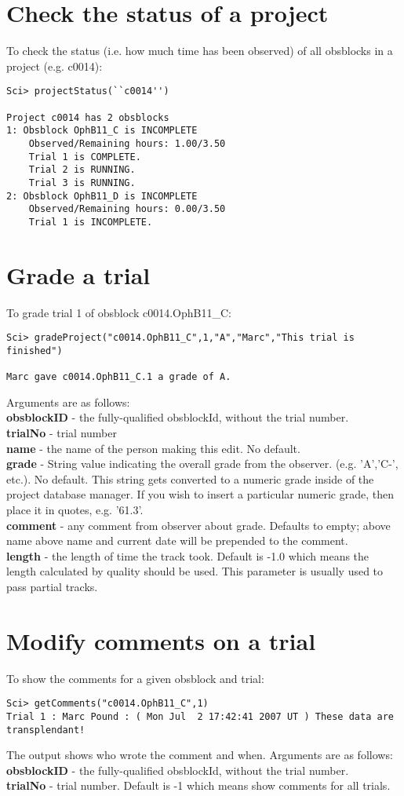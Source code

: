 \documentclass[preprint]{aastex} %
\begin{document}
\section{Check the status of a project}
To check the status (i.e. how much time has been observed) of all obsblocks in a project (e.g. c0014):
\begin{verbatim}
Sci> projectStatus(``c0014'')

Project c0014 has 2 obsblocks 
1: Obsblock OphB11_C is INCOMPLETE
    Observed/Remaining hours: 1.00/3.50
    Trial 1 is COMPLETE. 
    Trial 2 is RUNNING. 
    Trial 3 is RUNNING. 
2: Obsblock OphB11_D is INCOMPLETE
    Observed/Remaining hours: 0.00/3.50
    Trial 1 is INCOMPLETE. 
\end{verbatim}

\section{Grade a trial}
To grade trial 1 of obsblock c0014.OphB11\_C:
\begin{verbatim}
Sci> gradeProject("c0014.OphB11_C",1,"A","Marc","This trial is finished")

Marc gave c0014.OphB11_C.1 a grade of A.
\end{verbatim}
\noindent Arguments are as follows:\\
{\bf obsblockID} - the fully-qualified obsblockId, without the trial number.\\
{\bf trialNo} - trial number\\
{\bf name} - the name of the person making this edit. No default.\\
{\bf grade} - String value indicating the overall grade from the observer. (e.g. 'A','C-', etc.). No default.  This string gets converted to a numeric grade inside of the project database manager.  If you wish to insert a particular numeric grade, then place it in quotes, e.g.  '61.3'.\\
{\bf comment} - any comment from observer about grade. Defaults to empty; above name above name and current date will be prepended to the comment.\\
{\bf length} - the length of time the track took. Default is -1.0 which means the length calculated by quality should be used. This parameter is usually used to pass partial tracks.

\section{Modify comments on a trial}
To show the comments for a given obsblock and trial:
\begin{verbatim}
Sci> getComments("c0014.OphB11_C",1)
Trial 1 : Marc Pound : ( Mon Jul  2 17:42:41 2007 UT ) These data are transplendant! 
\end{verbatim}
\noindent The output shows who wrote the comment and when. Arguments are as follows:\\
{\bf obsblockID} - the fully-qualified obsblockId, without the trial number.\\
{\bf trialNo} - trial number. Default is -1 which means show comments for all trials.
\end{document}
